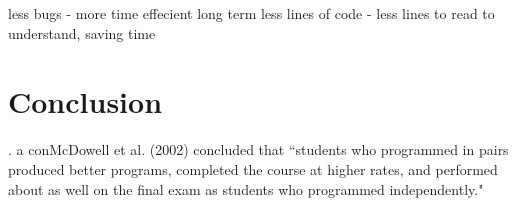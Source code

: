 \documentclass{scrartcl}
\begin{document}
less bugs - more time effecient long term
less lines of code - less lines to read to understand, saving time

\section{Conclusion}

 . a conMcDowell et al. (2002) concluded that “students who programmed in pairs produced better programs, completed the course at higher rates, and performed about as well on the final exam as students who programmed independently."



\end{document}

